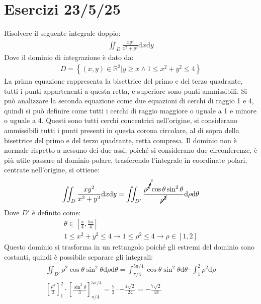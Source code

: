 \documentclass{article}
\newcommand{\df}{\mathrm{d}}
\numberwithin{equation}{subsection}
\begin{document}
\clearpage

\section{Esercizi 23/5/25}

Risolvere il seguente integrale doppio:
\begin{gather*}
    \iint_D \frac{xy^2}{x^2+y^2}\df x\df y
\end{gather*}
Dove il dominio di integrazione è dato da:
\begin{gather*}
    D=\left\{(x,y)\in\mathbb{R}^2\big| y\geq x\land 1\leq x^2+y^2\leq 4\right\}
\end{gather*}
La prima equazione rappresenta la bisettrice del primo e del terzo quadrante, tutti i punti appartenenti a questa retta, e superiore sono punti ammissibili. 
Si può analizzare la seconda equazione come due equazioni di cerchi di raggio 1 e 4, quindi si può definire come tutti i cerchi di raggio maggiore o uguale a 1 e minore o uguale a 4. Questi sono tutti cerchi concentrici nell'origine, si considerano ammissibili tutti i punti presenti in questa corona circolare, al di sopra della bisettrice del primo e del terzo quadrante, retta compresa. 
Il dominio non è normale rispetto a nessuno dei due assi, poiché si considerano due circonferenze, è più utile passare al dominio polare, trasferendo l'integrale in coordinate polari, centrate nell'origine, si ottiene:
\begin{gather*}
    \iint_D \frac{xy^2}{x^2+y^2}\df x\df y=\iint_{D'}\frac{\rho^{\cancelto{2}{4}}\cos\theta\sin^2\theta}{\cancel{\rho^2}}\df\rho\df\theta
\end{gather*}
Dove $D'$ è definito come:
\begin{gather*}
    \theta\in\left[\frac{\pi}{4},\frac{5\pi}{4}\right]\\
    1\leq x^2+y^2\leq4\to1\leq\rho^2\leq4\to\rho\in[1,2]
\end{gather*}
Questo dominio si trasforma in un rettangolo poiché gli estremi del dominio sono costanti, quindi è possibile separare gli integrali:
\begin{gather*}
    \iint_{D'}\rho^2\cos\theta\sin^2\theta\df\rho\df\theta=\int_{\pi/4}^{5\pi/4}\cos\theta\sin^2\theta\df\theta\cdot\int_1^2\rho^2\df\rho\\
    \left[\frac{\rho^3}{3}\right]_1^2\cdot\left[\frac{\sin^3\theta}{3}\right]_{\pi/4}^{5\pi/4}=\frac{7}{3}\cdot-\frac{4\sqrt{2}}{24}=-\frac{7\sqrt{2}}{18}
\end{gather*}
\end{document}
